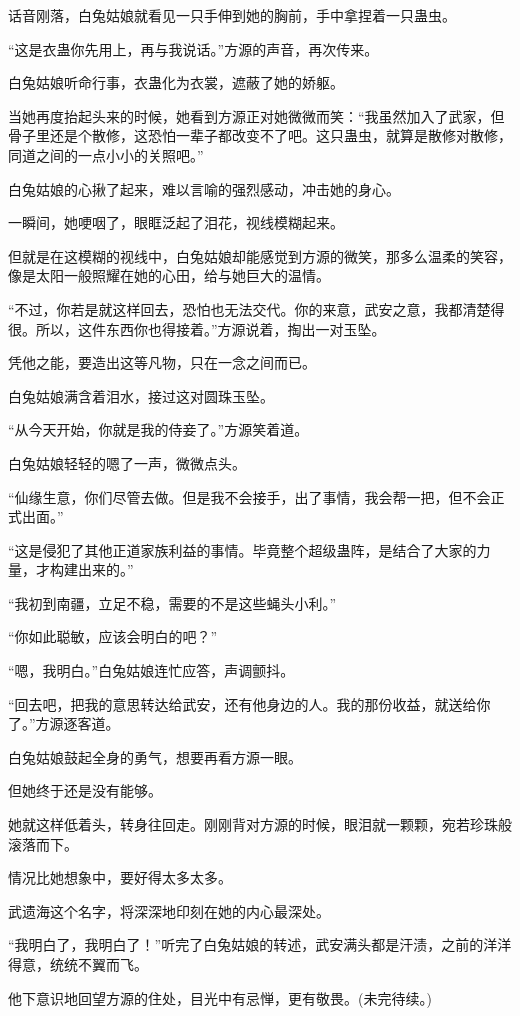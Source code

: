 \begin{this_body}
话音刚落，白兔姑娘就看见一只手伸到她的胸前，手中拿捏着一只蛊虫。

“这是衣蛊你先用上，再与我说话。”方源的声音，再次传来。

白兔姑娘听命行事，衣蛊化为衣裳，遮蔽了她的娇躯。

当她再度抬起头来的时候，她看到方源正对她微微而笑：“我虽然加入了武家，但骨子里还是个散修，这恐怕一辈子都改变不了吧。这只蛊虫，就算是散修对散修，同道之间的一点小小的关照吧。”

白兔姑娘的心揪了起来，难以言喻的强烈感动，冲击她的身心。

一瞬间，她哽咽了，眼眶泛起了泪花，视线模糊起来。

但就是在这模糊的视线中，白兔姑娘却能感觉到方源的微笑，那多么温柔的笑容，像是太阳一般照耀在她的心田，给与她巨大的温情。

“不过，你若是就这样回去，恐怕也无法交代。你的来意，武安之意，我都清楚得很。所以，这件东西你也得接着。”方源说着，掏出一对玉坠。

凭他之能，要造出这等凡物，只在一念之间而已。

白兔姑娘满含着泪水，接过这对圆珠玉坠。

“从今天开始，你就是我的侍妾了。”方源笑着道。

白兔姑娘轻轻的嗯了一声，微微点头。

“仙缘生意，你们尽管去做。但是我不会接手，出了事情，我会帮一把，但不会正式出面。”

“这是侵犯了其他正道家族利益的事情。毕竟整个超级蛊阵，是结合了大家的力量，才构建出来的。”

“我初到南疆，立足不稳，需要的不是这些蝇头小利。”

“你如此聪敏，应该会明白的吧？”

“嗯，我明白。”白兔姑娘连忙应答，声调颤抖。

“回去吧，把我的意思转达给武安，还有他身边的人。我的那份收益，就送给你了。”方源逐客道。

白兔姑娘鼓起全身的勇气，想要再看方源一眼。

但她终于还是没有能够。

她就这样低着头，转身往回走。刚刚背对方源的时候，眼泪就一颗颗，宛若珍珠般滚落而下。

情况比她想象中，要好得太多太多。

武遗海这个名字，将深深地印刻在她的内心最深处。

“我明白了，我明白了！”听完了白兔姑娘的转述，武安满头都是汗渍，之前的洋洋得意，统统不翼而飞。

他下意识地回望方源的住处，目光中有忌惮，更有敬畏。(未完待续。)

\end{this_body}

